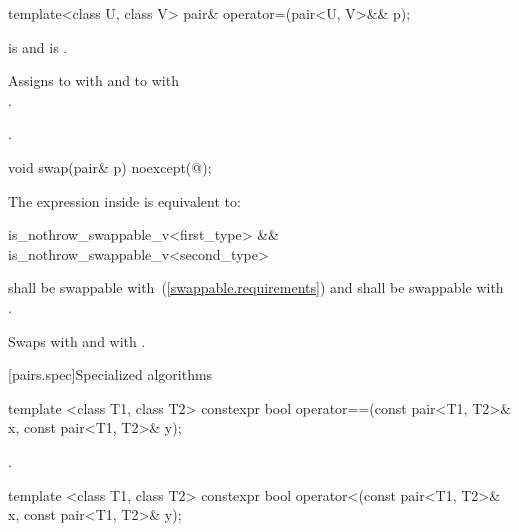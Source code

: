%
\begin{itemdecl}
template<class U, class V> pair& operator=(pair<U, V>&& p);
\end{itemdecl}

\begin{itemdescr}
\pnum
\requires {} is 
and  is .

\pnum
\effects
Assigns to  with 
and to  with\\ .

\pnum
\returns {}.
\end{itemdescr}

%
\begin{itemdecl}
void swap(pair& p) noexcept(@\seebelow@);
\end{itemdecl}

\begin{itemdescr}
\pnum
\remarks The expression inside  is equivalent to:

\begin{codeblock}
is_nothrow_swappable_v<first_type> &&
is_nothrow_swappable_v<second_type>
\end{codeblock}

\pnum
\requires
{} shall be swappable with~(\ref{swappable.requirements})
 and  shall be swappable with .

\pnum
\effects Swaps
 with  and
 with .
\end{itemdescr}

[pairs.spec]{Specialized algorithms}

%
\begin{itemdecl}
template <class T1, class T2>
  constexpr bool operator==(const pair<T1, T2>& x, const pair<T1, T2>& y);
\end{itemdecl}

\begin{itemdescr}
\pnum
\returns
{}.
\end{itemdescr}

%
\begin{itemdecl}
template <class T1, class T2>
  constexpr bool operator<(const pair<T1, T2>& x, const pair<T1, T2>& y);
\end{itemdecl}

